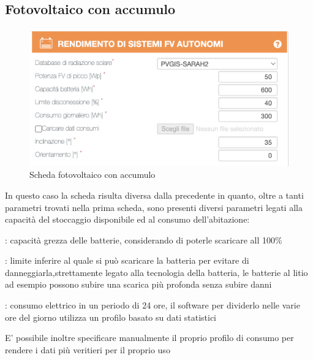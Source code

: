 \subsection{Fotovoltaico con accumulo}
\begin{figure}[H]
    \centering
    \includegraphics[height=0.5\textwidth]{res/cap 4/fotovoltaico con accumulo}
    \caption{Scheda fotovoltaico con accumulo}
\end{figure}\noindent
In questo caso la scheda risulta diversa dalla precedente in quanto, oltre a tanti parametri trovati nella prima scheda, sono presenti diversi parametri legati alla capacità del stoccaggio disponibile ed al consumo dell'abitazione:
\begin{description}[labelindent=5mm]
    \item[$\bullet$ Capacità batteria]: capacità grezza delle batterie, considerando di poterle scaricare all 100\%
    \item[$\bullet$ Limite di disconnessione]: limite inferire al quale si può scaricare la batteria per evitare di danneggiarla,strettamente legato alla tecnologia della batteria, le batterie al litio ad esempio possono subire una scarica più profonda senza subire danni
    \item[$\bullet$ Consumo giornaliero]: consumo elettrico in un periodo di 24 ore, il software per dividerlo nelle varie ore del giorno utilizza un profilo basato su dati statistici
\end{description}
E' possibile inoltre specificare manualmente il proprio profilo di consumo per rendere i dati più veritieri per il proprio uso

